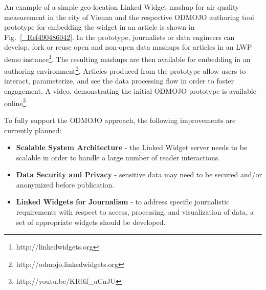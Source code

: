 \documentclass[runningheads,a4paper]{llncs}
\begin{document}
An example of a simple geo-location Linked Widget mashup for air quality measurement in the city of Vienna and the respective ODMOJO authoring tool prototype for embedding the widget in an article is shown in Fig.~\ref{_Ref490486042}. In the prototype, journalists or data engineers can develop, fork or reuse open and non-open data mashups for articles in an LWP demo instance\footnote{ http://linkedwidgets.org}. The resulting mashups are then available for embedding in an authoring environment\footnote{ http://odmojo.linkedwidgets.org}. Articles produced from the prototype allow users to interact, parameterize, and see the data processing flow in order to foster engagement. A video, demonstrating the initial ODMOJO prototype is available online\footnote{ http://youtu.be/KR0if\_uCnJU}. 

To fully support the ODMOJO approach, the following improvements are currently planned: 
\begin{itemize}
\item {\bf Scalable System Architecture} - the Linked Widget server needs to be scalable in order to handle a large number of reader interactions.
\item {\bf Data Security and Privacy} - sensitive data may need to be secured and/or anonymized before publication. 
\item {\bf Linked Widgets for Journalism} - to address specific journalistic requirements with respect to access, processing, and visualization of data, a set of appropriate widgets should be developed.
\end{itemize}
\end{document}
